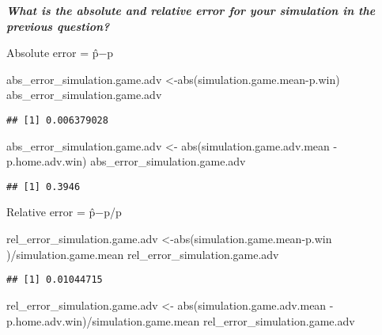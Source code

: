 \documentclass[
]{article}
\newenvironment{Shaded}{\begin{snugshade}}{\end{snugshade}}
\newcommand{\FunctionTok}[1]{\textcolor[rgb]{0.00,0.00,0.00}{#1}}
\newcommand{\NormalTok}[1]{#1}
\newcommand{\OtherTok}[1]{\textcolor[rgb]{0.56,0.35,0.01}{#1}}
\newcommand{\SpecialCharTok}[1]{\textcolor[rgb]{0.00,0.00,0.00}{#1}}
\begin{document}
\textbf{\emph{What is the absolute and relative error for your
simulation in the previous question?}}

Absolute error = \textbar p̂−p\textbar{}

\begin{Shaded}
\begin{Highlighting}[]
\NormalTok{abs\_error\_simulation.game.adv }\OtherTok{\textless{}{-}}\FunctionTok{abs}\NormalTok{(simulation.game.mean}\SpecialCharTok{{-}}\NormalTok{p.win)}
\NormalTok{abs\_error\_simulation.game.adv}
\end{Highlighting}
\end{Shaded}

\begin{verbatim}
## [1] 0.006379028
\end{verbatim}

\begin{Shaded}
\begin{Highlighting}[]
\NormalTok{abs\_error\_simulation.game.adv }\OtherTok{\textless{}{-}} \FunctionTok{abs}\NormalTok{(simulation.game.adv.mean }\SpecialCharTok{{-}}\NormalTok{ p.home.adv.win)}
\NormalTok{abs\_error\_simulation.game.adv }
\end{Highlighting}
\end{Shaded}

\begin{verbatim}
## [1] 0.3946
\end{verbatim}

Relative error = \textbar p̂−p\textbar/p

\begin{Shaded}
\begin{Highlighting}[]
\NormalTok{rel\_error\_simulation.game.adv }\OtherTok{\textless{}{-}}\FunctionTok{abs}\NormalTok{(simulation.game.mean}\SpecialCharTok{{-}}\NormalTok{p.win )}\SpecialCharTok{/}\NormalTok{simulation.game.mean}
\NormalTok{rel\_error\_simulation.game.adv}
\end{Highlighting}
\end{Shaded}

\begin{verbatim}
## [1] 0.01044715
\end{verbatim}

\begin{Shaded}
\begin{Highlighting}[]
\NormalTok{rel\_error\_simulation.game.adv }\OtherTok{\textless{}{-}} \FunctionTok{abs}\NormalTok{(simulation.game.adv.mean }\SpecialCharTok{{-}}\NormalTok{ p.home.adv.win)}\SpecialCharTok{/}\NormalTok{simulation.game.mean}
\NormalTok{rel\_error\_simulation.game.adv }
\end{Highlighting}
\end{Shaded}
\end{document}
